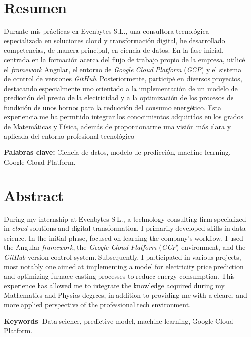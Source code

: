 \section*{Resumen}

Durante mis prácticas en Evenbytes S.L., una consultora tecnológica especializada en soluciones cloud y transformación digital, he desarrollado competencias, de manera principal, en ciencia de datos. En la fase inicial, centrada en la formación acerca del flujo de trabajo propio de la empresa, utilicé el \textit{framework} Angular, el entorno de \textit{Google Cloud Platform} (\textit{GCP}) y el sistema de control de versiones \textit{GitHub}. Posteriormente, participé en diversos proyectos, destacando especialmente uno orientado a la implementación de un modelo de predicción del precio de la electricidad y a la optimización de los procesos de fundición de unos hornos para la reducción del consumo energético. Esta experiencia me ha permitido integrar los conocimientos adquiridos en los grados de Matemáticas y Física, además de proporcionarme una visión más clara y aplicada del entorno profesional tecnológico.

\vspace{1cm}
\noindent\textbf{Palabras clave:} Ciencia de datos, modelo de predicción, machine learning, Google Cloud Platform.
 

\section*{Abstract}

During my internship at Evenbytes S.L., a technology consulting firm specialized in \textit{cloud} solutions and digital transformation, I primarily developed skills in data science. In the initial phase, focused on learning the company's workflow, I used the Angular \textit{framework}, the \textit{Google Cloud Platform} (\textit{GCP}) environment, and the \textit{GitHub} version control system. Subsequently, I participated in various projects, most notably one aimed at implementing a model for electricity price prediction and optimizing furnace casting processes to reduce energy consumption. This experience has allowed me to integrate the knowledge acquired during my Mathematics and Physics degrees, in addition to providing me with a clearer and more applied perspective of the professional tech environment.

\vspace{1cm}
\noindent\textbf{Keywords:} Data science,  predictive model, machine learning, Google Cloud Platform.


